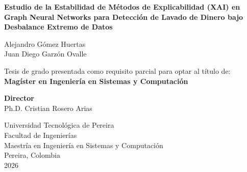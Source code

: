\documentclass[a4paper,oneside,12pt]{book}
\begin{document}
\begin{titlepage}

\begin{center}

\vspace*{1cm} %

{\LARGE \bfseries \linespread{1.3}\selectfont
Estudio de la Estabilidad de Métodos de Explicabilidad (XAI) en Graph Neural Networks para Detección de Lavado de Dinero bajo Desbalance Extremo de Datos\par}

\vspace{2cm}

{\Large
Alejandro Gómez Huertas \\[0.3cm]
Juan Diego Garzón Ovalle
}

\vspace{2.5cm}

{\large Tesis de grado presentada como requisito parcial para optar al título de:}\\[0.5cm]
{\Large \textbf{Magíster en Ingeniería en Sistemas y Computación}}

\vspace{2cm}

{\large \textbf{Director} \\[0.2cm]
\Large Ph.D. Cristian Rosero Arias}

\vfill

{\large
Universidad Tecnológica de Pereira \\
Facultad de Ingenierías \\
Maestría en Ingeniería en Sistemas y Computación \\
Pereira, Colombia \\
2026
}

\end{center}

\end{titlepage}



\end{document}

